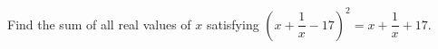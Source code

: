 Find the sum of all real values of $x$ satisfying $\left(x+\dfrac{1}{x}-17\right)^2=x+\dfrac{1}{x}+17$.
